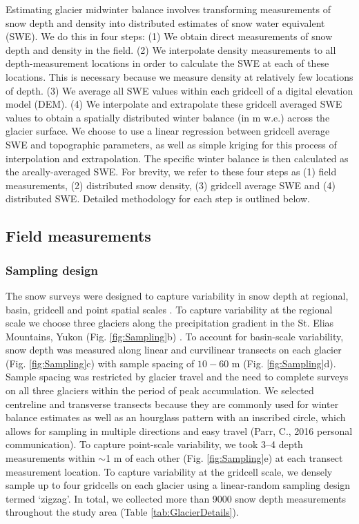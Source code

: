 \documentclass[twocolumn, letterpaper]{igs}
\begin{document}
Estimating glacier midwinter balance involves transforming measurements of snow depth and density into distributed estimates of snow water equivalent (SWE). We do this in four steps: (1) We obtain direct measurements of snow depth and density in the field. (2) We interpolate density measurements to all depth-measurement locations in order to calculate the SWE at each of these locations. This is necessary because we measure density at relatively few locations of depth. (3) We average all SWE values within each gridcell of a digital elevation model (DEM). (4) We interpolate and extrapolate these gridcell averaged SWE values to obtain a spatially distributed winter balance (in m w.e.) across the glacier surface. We choose to use a linear regression between gridcell average SWE and topographic parameters, as well as simple kriging for this process of interpolation and extrapolation. The specific winter balance is then calculated as the areally-averaged SWE. For brevity, we refer to these four steps as (1) field measurements, (2) distributed snow density, (3) gridcell average SWE and (4) distributed SWE. Detailed methodology for each step is outlined below.

\subsection{Field measurements}

\subsubsection{Sampling design}

The snow surveys were designed to capture variability in snow depth at regional, basin, gridcell and point spatial scales \citep{Clark2011}. To capture variability at the regional scale we choose three glaciers along the precipitation gradient in the St. Elias Mountains, Yukon (Fig. \ref{fig:Sampling}b) \citep{Taylor1969}. To account for basin-scale variability, snow depth was measured along linear and curvilinear transects on each glacier (Fig. \ref{fig:Sampling}c) with sample spacing of $10-60$ m (Fig. \ref{fig:Sampling}d). Sample spacing was restricted by glacier travel and the need to complete surveys on all three glaciers within the period of peak accumulation. We selected centreline and transverse transects because they are commonly used for winter balance estimates \citep[e.g.][]{Kaser2003, Machguth2006} as well as an hourglass pattern with an inscribed circle, which allows for sampling in multiple directions and easy travel (Parr, C., 2016 personal communication). To capture point-scale variability, we took 3--4 depth measurements within $\sim$1 m of each other (Fig. \ref{fig:Sampling}e) at each transect measurement location. To capture variability at the gridcell scale, we densely sample up to four gridcells on each glacier using a linear-random sampling design termed `zigzag'. In total, we collected more than 9000 snow depth measurements throughout the study area (Table \ref {tab:GlacierDetails}). 
\end{document}

